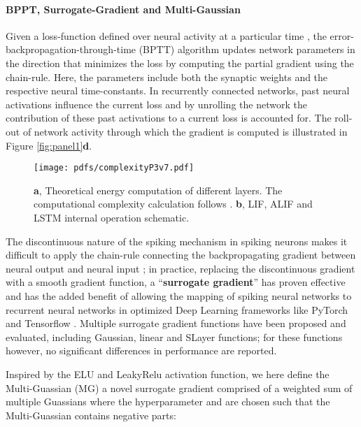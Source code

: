 \documentclass[fleqn,10pt]{wlscirep}
\begin{document}
\paragraph{BPPT, Surrogate-Gradient and Multi-Gaussian}







Given a loss-function  defined over neural activity at a particular time , the error-backpropagation-through-time (BPTT) algorithm \cite{werbos1990backpropagation} updates network parameters  in the direction that minimizes the loss by computing the partial gradient  using the chain-rule. Here, the parameters  include both the synaptic weights and the respective neural time-constants. In recurrently connected networks, past neural activations influence the current loss and by unrolling the network the contribution of these past activations to a current loss is accounted for. The roll-out of network activity through which the gradient is computed is illustrated in Figure \ref{fig:panel1}\textbf{d}. 

\begin{figure}[ht!]
\centering
\texttt{[image: pdfs/complexityP3v7.pdf]}
\caption{\textbf{a}, Theoretical energy computation of different layers. The computational complexity calculation follows \cite{hunger2005floating}. \textbf{b}, LIF, ALIF and LSTM internal operation schematic.}
\label{fig:compcost}
\end{figure}

The discontinuous nature of the spiking mechanism in spiking neurons makes it difficult to apply the chain-rule connecting the backpropagating gradient between neural output and neural input \cite{bohte2000spikeprop}; in practice, replacing the discontinuous gradient with a smooth gradient function, a ``{\bf surrogate gradient}'' has proven effective  \cite{bohte2011error,neftci2019surrogate,bellec2020solution} and has the added benefit of allowing the mapping of spiking neural networks to recurrent neural networks in optimized Deep Learning frameworks like PyTorch and Tensorflow \cite{neftci2019surrogate}. Multiple surrogate gradient functions have been proposed and evaluated, including Gaussian, linear\cite{bellec2018long} and SLayer \cite{shrestha2018slayer} functions; for these functions however, no significant differences in performance are reported\cite{neftci2019surrogate}. 

Inspired by the ELU\cite{clevert2015fast} and LeakyRelu\cite{} activation function, we here define the Multi-Guassian (MG) a novel surrogate gradient  comprised of a weighted sum of multiple Guassians  where the hyperparameter  and  are chosen such that the Multi-Guassian contains negative parts:
\end{document}
